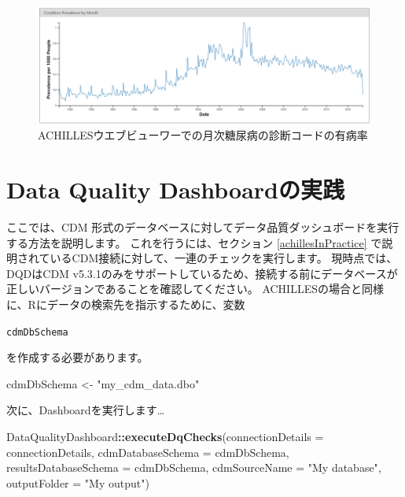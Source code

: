 \documentclass[
  11pt]{book}
\newenvironment{Shaded}{\begin{snugshade}}{\end{snugshade}}
\newcommand{\AttributeTok}[1]{\textcolor[rgb]{0.13,0.29,0.53}{#1}}
\newcommand{\FunctionTok}[1]{\textcolor[rgb]{0.13,0.29,0.53}{\textbf{#1}}}
\newcommand{\NormalTok}[1]{#1}
\newcommand{\OtherTok}[1]{\textcolor[rgb]{0.56,0.35,0.01}{#1}}
\newcommand{\SpecialCharTok}[1]{\textcolor[rgb]{0.81,0.36,0.00}{\textbf{#1}}}
\newcommand{\StringTok}[1]{\textcolor[rgb]{0.31,0.60,0.02}{#1}}
\theoremstyle{definition}
\theoremstyle{definition}
\theoremstyle{definition}
\theoremstyle{definition}
\theoremstyle{remark}
\begin{document}
\begin{figure}

{\centering \includegraphics[width=1\linewidth]{images/DataQuality/achillesCodeChange} 

}

\caption{ACHILLESウエブビューワーでの月次糖尿病の診断コードの有病率}\label{fig:achillesCodeChange}
\end{figure}

\section{Data Quality Dashboardの実践}\label{dqdInPractice}

ここでは、CDM 形式のデータベースに対してデータ品質ダッシュボードを実行する方法を説明します。 これを行うには、セクション \ref{achillesInPractice} で説明されているCDM接続に対して、一連のチェックを実行します。 現時点では、DQDはCDM v5.3.1のみをサポートしているため、接続する前にデータベースが正しいバージョンであることを確認してください。 ACHILLESの場合と同様に、Rにデータの検索先を指示するために、変数

\texttt{cdmDbSchema}

を作成する必要があります。

\begin{Shaded}
\begin{Highlighting}[]
\NormalTok{cdmDbSchema }\OtherTok{\textless{}{-}} \StringTok{"my\_cdm\_data.dbo"}
\end{Highlighting}
\end{Shaded}

次に、Dashboardを実行します\ldots{}

\begin{Shaded}
\begin{Highlighting}[]
\NormalTok{DataQualityDashboard}\SpecialCharTok{::}\FunctionTok{executeDqChecks}\NormalTok{(}\AttributeTok{connectionDetails =}\NormalTok{ connectionDetails,}
                                      \AttributeTok{cdmDatabaseSchema =}\NormalTok{ cdmDbSchema,}
                                      \AttributeTok{resultsDatabaseSchema =}\NormalTok{ cdmDbSchema,}
                                      \AttributeTok{cdmSourceName =} \StringTok{"My database"}\NormalTok{,}
                                      \AttributeTok{outputFolder =} \StringTok{"My output"}\NormalTok{)}
\end{Highlighting}
\end{Shaded}
\end{document}

